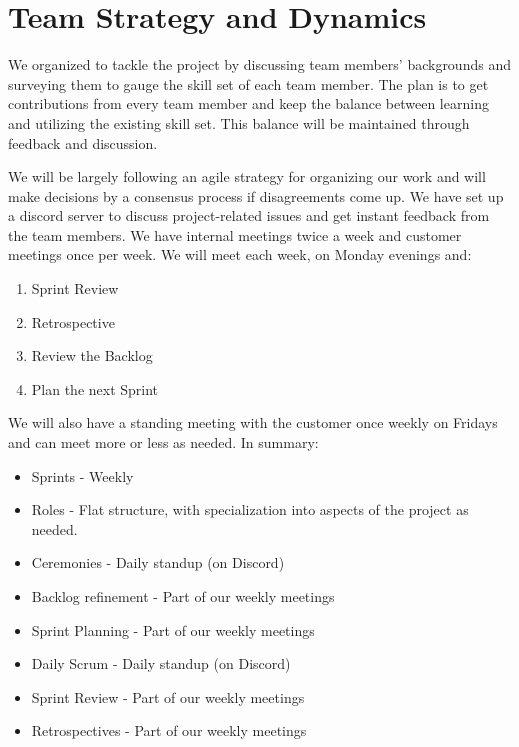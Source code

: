 \section{Team Strategy and Dynamics}

We organized to tackle the project by discussing team members’ backgrounds and surveying them to gauge the skill set of each team member. The plan is to get contributions from every team member and keep the balance between learning and utilizing the existing skill set. This balance will be maintained through feedback and discussion.

We will be largely following an agile strategy for organizing our work and will make decisions by a consensus process if disagreements come up. We have set up a discord server to discuss project-related issues and get instant feedback from the team members. We have internal meetings twice a week and customer meetings once per week. We will meet each week, on Monday evenings and:
\begin{enumerate}
    \item Sprint Review
    \item Retrospective
    \item Review the Backlog
    \item Plan the next Sprint
\end{enumerate}
We will also have a standing meeting with the customer once weekly on Fridays and can meet more or less as needed. In summary:
\begin{itemize}
    \item Sprints - Weekly
    \item Roles - Flat structure, with specialization into aspects of the project as needed.
    \item Ceremonies - Daily standup (on Discord)
    \item Backlog refinement - Part of our weekly meetings
    \item Sprint Planning - Part of our weekly meetings
    \item Daily Scrum - Daily standup (on Discord)
    \item Sprint Review - Part of our weekly meetings
    \item Retrospectives - Part of our weekly meetings
\end{itemize}
